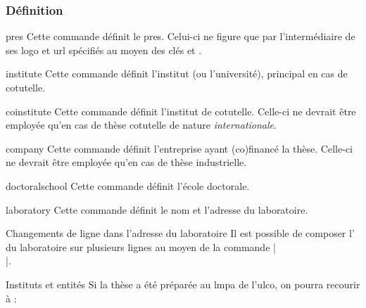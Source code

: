 \subsubsection{Définition}
%
\begin{docCommand}{pres}{}
  Cette commande définit le \gls{pres}. Celui-ci ne figure que par
  l'intermédiaire de ses logo et \acrshort{url} spécifiés au moyen des clés
   et .
\end{docCommand}
%
\begin{docCommand}[doc description=\mandatory]{institute}{}
  Cette commande définit l'institut (ou l'université), principal
  en cas de cotutelle.
\end{docCommand}
%
\begin{docCommand}{coinstitute}{}
  Cette commande définit l'institut de cotutelle. Celle-ci ne
  devrait être employée qu'en cas de thèse cotutelle de nature
  \emph{internationale}.
\end{docCommand}
%
\begin{docCommand}{company}{}
  Cette commande définit l'entreprise ayant (co)financé la thèse.
  Celle-ci ne devrait être employée qu'en cas de thèse industrielle.
\end{docCommand}
%
\begin{docCommand}[doc description=\mandatory]{doctoralschool}{}
  Cette commande définit l'école doctorale.
\end{docCommand}
%
\begin{docCommand}[doc description=\mandatory]{laboratory}{}
  Cette commande définit le nom et l'adresse du laboratoire.
\end{docCommand}
%
\begin{dbremark}{Changements de ligne dans l'adresse du laboratoire}{}
  Il est possible de composer l' du laboratoire sur plusieurs
  lignes au moyen de la commande |\\|.
\end{dbremark}
%
\begin{dbexample}{Instituts et entités}{}
  Si la thèse a été préparée au \gls{lmpa} de l'\gls{ulco}, on
  pourra recourir à :
  \NoAutoSpacing%
\begin{bodycode}
\end{bodycode}
\end{dbexample}
